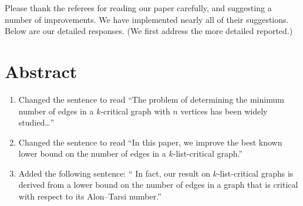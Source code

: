 \documentclass{article}
\begin{document}
Please thank the referees for reading our paper carefully, and suggesting a number
of improvements.  We have implemented nearly all of their suggestions.
Below are our detailed responses.  (We first address the more detailed reported.)

\setcounter{section}{-1}
\section{Abstract}
\begin{enumerate}
\item Changed the sentence to read ``The problem of determining
the minimum number of edges in a $k$-critical graph with $n$ vertices has been
widely studied\ldots''
\item Changed the sentence to read ``In this paper, we improve the best
known lower bound on the number of edges in a $k$-list-critical graph.''
\item Added the following sentence: `` In fact,
our result on $k$-list-critical graphs is derived from a lower bound on the
number of edges in a graph that is critical with respect to its Alon--Tarsi
number.''
\end{enumerate}
\end{document}
